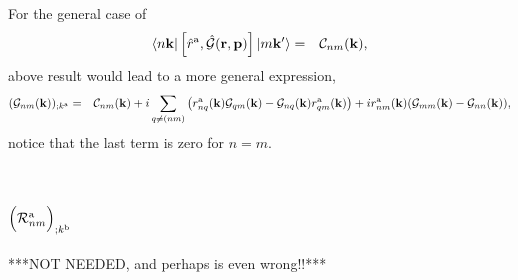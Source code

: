 \documentclass[floatfix,prb,aps,superscriptaddress,11pt,preprint]{revtex4}
\begin{document}
For the general
case of
\begin{eqnarray}\label{a.8}
\langle n\mathbf{k} |
\left[\hat r^{\mathrm{a}},\hat{{\mathbf{\cal G}}}(\mathbf{r},\mathbf{p})\right]
| m\mathbf{k}' \rangle
&=&
{\mathbf{\cal C}}_{nm}(\mathbf{k})
,
\end{eqnarray}
above result would lead to a more general expression, 
\begin{eqnarray}\label{a.9}
({\mathbf{\cal G}}_{nm}(\mathbf{k}))_{;k^{\mathrm{a}}}
&=&
{\mathbf{\cal C}}_{nm}(\mathbf{k})
+
i\sum_{q\ne(nm)}
\left(
r_{nq}^{\mathrm{a}} (\mathbf{k})
{\mathbf{\cal G}}_{qm}(\mathbf{k})
-
{\mathbf{\cal G}}_{nq}(\mathbf{k})
r_{qm}^{\mathrm{a}} (\mathbf{k})
\right)
+ir_{nm}^{\mathrm{a}} (\mathbf{k}) ({\mathbf{\cal G}}_{mm}(\mathbf{k})-{\mathbf{\cal G}}_{nn}(\mathbf{k}))
,
\nonumber\\
\end{eqnarray}
notice that the last term is zero for $n=m$.

\section{$\Big({\cal R}^{\mathrm{a}}_{nm}\Big)_{;k^{\mathrm{b}}}$}\label{calr}

***NOT NEEDED, and perhaps is even wrong!!***
 
\end{document}
